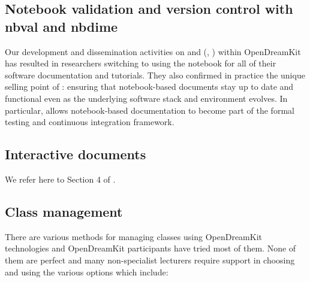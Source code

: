 \documentclass{deliverablereport}
\begin{document}
\subsection{Notebook validation and version control with nbval and nbdime}

Our development and dissemination activities on \nbval and \nbdime
(, ) within
OpenDreamKit has resulted in researchers switching to using the
notebook for all of their software documentation and tutorials. They
also confirmed in practice the unique selling point of \nbval:
ensuring that notebook-based documents stay up to date and functional
even as the underlying software stack and environment evolves. In
particular, \nbval allows notebook-based documentation to become part
of the formal testing and continuous integration framework.

\subsection{Interactive documents}

We refer here to Section 4 of .

\subsection{Class management}

There are various methods for managing classes using OpenDreamKit
technologies and OpenDreamKit participants have tried most of them. None
of them are perfect and many non-specialist lecturers require support in
choosing and using the various options which include:
\end{document}
